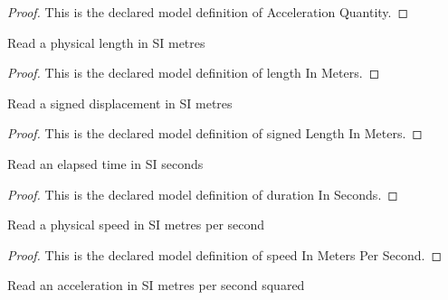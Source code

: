 \begin{proof}
  This is the declared model definition of Acceleration Quantity.
\end{proof}
\begin{definition}
  \label{def:physics:phyx-mini-0746:phyxminiproblems-problemphyxmini0746-lengthinmeters}
  Read a physical length in SI metres
\end{definition}
\begin{proof}
  This is the declared model definition of length In Meters.
\end{proof}
\begin{definition}
  \label{def:physics:phyx-mini-0746:phyxminiproblems-problemphyxmini0746-signedlengthinmeters}
  Read a signed displacement in SI metres
\end{definition}
\begin{proof}
  This is the declared model definition of signed Length In Meters.
\end{proof}
\begin{definition}
  \label{def:physics:phyx-mini-0746:phyxminiproblems-problemphyxmini0746-durationinseconds}
  Read an elapsed time in SI seconds
\end{definition}
\begin{proof}
  This is the declared model definition of duration In Seconds.
\end{proof}
\begin{definition}
  \label{def:physics:phyx-mini-0746:phyxminiproblems-problemphyxmini0746-speedinmeterspersecond}
  Read a physical speed in SI metres per second
\end{definition}
\begin{proof}
  This is the declared model definition of speed In Meters Per Second.
\end{proof}
\begin{definition}
  \label{def:physics:phyx-mini-0746:phyxminiproblems-problemphyxmini0746-accelerationinmeterspersecondsquared}
  Read an acceleration in SI metres per second squared
\end{definition}
